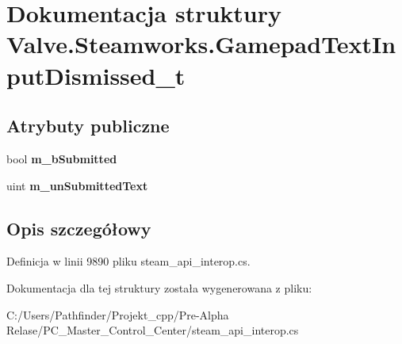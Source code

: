 \hypertarget{struct_valve_1_1_steamworks_1_1_gamepad_text_input_dismissed__t}{}\section{Dokumentacja struktury Valve.\+Steamworks.\+Gamepad\+Text\+Input\+Dismissed\+\_\+t}
\label{struct_valve_1_1_steamworks_1_1_gamepad_text_input_dismissed__t}
\subsection*{Atrybuty publiczne}
\begin{DoxyCompactItemize}
\item 
\mbox{\label{struct_valve_1_1_steamworks_1_1_gamepad_text_input_dismissed__t_adc0274f5ab99a2fa4a83e0d009a5ffba}} 
bool {\bfseries m\+\_\+b\+Submitted}
\item 
\mbox{\label{struct_valve_1_1_steamworks_1_1_gamepad_text_input_dismissed__t_a218aaeb4d295d3ed54e20af1d117799d}} 
uint {\bfseries m\+\_\+un\+Submitted\+Text}
\end{DoxyCompactItemize}


\subsection{Opis szczegółowy}


Definicja w linii 9890 pliku steam\+\_\+api\+\_\+interop.\+cs.



Dokumentacja dla tej struktury została wygenerowana z pliku\+:\begin{DoxyCompactItemize}
\item 
C\+:/\+Users/\+Pathfinder/\+Projekt\+\_\+cpp/\+Pre-\/\+Alpha Relase/\+P\+C\+\_\+\+Master\+\_\+\+Control\+\_\+\+Center/steam\+\_\+api\+\_\+interop.\+cs\end{DoxyCompactItemize}
